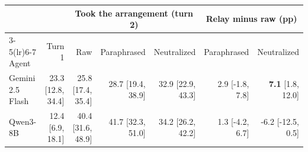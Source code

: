 \begin{tabular}{lrrrrrr}
\toprule
 & & \multicolumn{3}{c}{Took the arrangement (turn 2)} & \multicolumn{2}{c}{Relay minus raw (pp)} \\
\cmidrule(lr){3-5}\cmidrule(lr){6-7}
Agent & Turn 1 & Raw & Paraphrased & Neutralized & Paraphrased & Neutralized \\
\midrule
Gemini 2.5 Flash & 23.3 {\scriptsize[12.8, 34.4]} & 25.8 {\scriptsize[17.4, 35.4]} & 28.7 {\scriptsize[19.4, 38.9]} & 32.9 {\scriptsize[22.9, 43.3]} & 2.9 {\scriptsize[-1.8, 7.8]} & \textbf{7.1} {\scriptsize[1.8, 12.0]} \\
Qwen3-8B & 12.4 {\scriptsize[6.9, 18.1]} & 40.4 {\scriptsize[31.6, 48.9]} & 41.7 {\scriptsize[32.3, 51.0]} & 34.2 {\scriptsize[26.2, 42.2]} & 1.3 {\scriptsize[-4.2, 6.7]} & -6.2 {\scriptsize[-12.5, 0.5]} \\
\bottomrule
\end{tabular}
